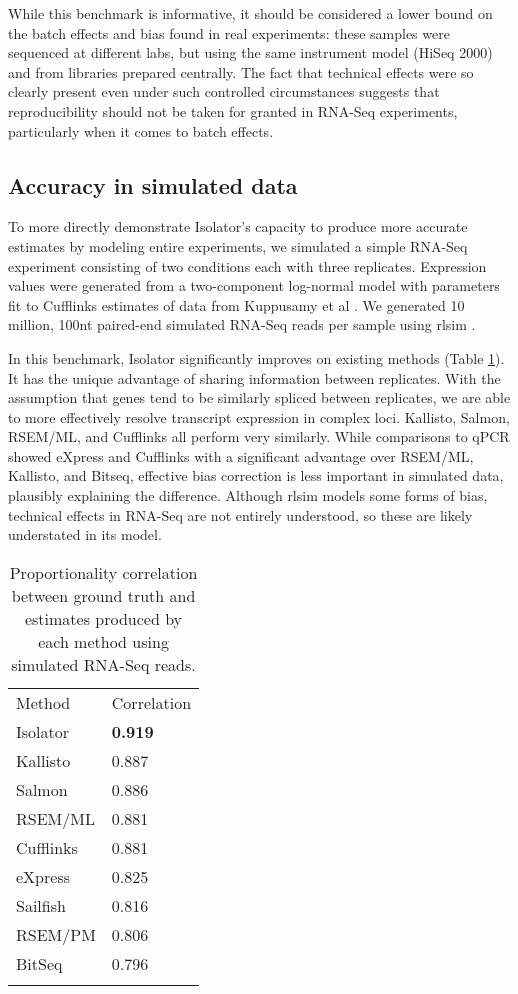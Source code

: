 \documentclass[twocolumn]{article}
\begin{document}
While this benchmark is informative, it should be considered a lower bound on
the batch effects and bias found in real experiments: these samples were
sequenced at different labs, but using the same instrument model (HiSeq 2000)
and from libraries prepared centrally. The fact that technical effects were so
clearly present even under such controlled circumstances suggests that
reproducibility should not be taken for granted in RNA-Seq experiments,
particularly when it comes to batch effects.

\subsection{Accuracy in simulated data}\label{accuracy-in-simulated-data}

To more directly demonstrate Isolator's capacity to produce more accurate
estimates by modeling entire experiments, we simulated a simple RNA-Seq
experiment consisting of two conditions each with three replicates. Expression
values were generated from a two-component log-normal model with parameters fit
to Cufflinks estimates of data from Kuppusamy et al \cite{Kuppusamy:2015ey}. We
generated 10 million, 100nt paired-end simulated RNA-Seq reads per sample using
rlsim \cite{Sipos:2013tz}.

In this benchmark, Isolator significantly improves on existing methods (Table
\ref{table:rlsim}). It has the unique advantage of sharing information between
replicates. With the assumption that genes tend to be similarly spliced between
replicates, we are able to more effectively resolve transcript expression in
complex loci. Kallisto, Salmon, RSEM/ML, and Cufflinks all perform very
similarly. While comparisons to qPCR showed eXpress and Cufflinks with a
significant advantage over RSEM/ML, Kallisto, and Bitseq, effective bias
correction is less important in simulated data, plausibly explaining the
difference. Although rlsim models some forms of bias, technical effects in
RNA-Seq are not entirely understood, so these are likely understated in its
model.

\begin{table}
\label{table:rlsim}
\begin{tabular}[c]{@{}ll@{}}
\toprule\addlinespace
Method & Correlation
\\\addlinespace
\midrule
Isolator & \textbf{0.919}
\\\addlinespace
Kallisto & 0.887
\\\addlinespace
Salmon & 0.886
\\\addlinespace
RSEM/ML & 0.881
\\\addlinespace
Cufflinks & 0.881
\\\addlinespace
eXpress & 0.825
\\\addlinespace
Sailfish & 0.816
\\\addlinespace
RSEM/PM & 0.806
\\\addlinespace
BitSeq & 0.796
\\\addlinespace
\bottomrule
\addlinespace
\end{tabular}
\caption{
Proportionality correlation between ground truth and estimates
produced by each method using simulated RNA-Seq reads.}
\end{table}
\end{document}
